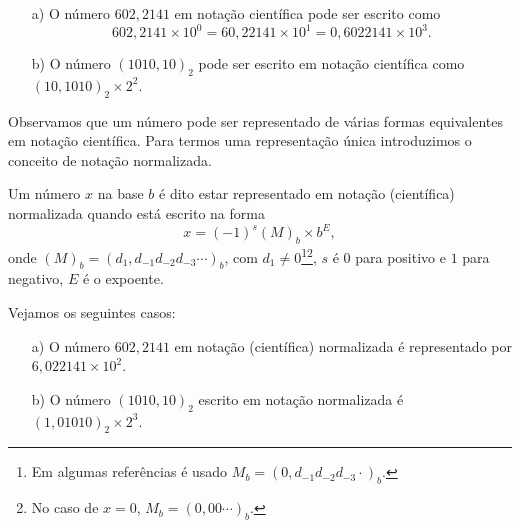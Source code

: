\begin{ex}
  \begin{itemize}
  \item[a)] O número $602,2141$ em notação científica pode ser escrito como
    \begin{equation}
      602,2141\times 10^0 = 60,22141\times 10^{1} = 0,6022141\times 10^{3}.
    \end{equation}
  \item[b)] O número $(1010,10)_2$ pode ser escrito em notação científica como $(10,1010)_2\times 2^2$.
  \end{itemize}
\end{ex}

Observamos que um número pode ser representado de várias formas equivalentes em notação científica. Para termos uma representação única introduzimos o conceito de notação normalizada.

\begin{defn}
  Um número $x$ na base $b$ é dito estar representado em notação (científica) normalizada quando está escrito na forma
  \begin{equation}
    x=(-1)^{s}(M)_b \times b^{E},
  \end{equation}
onde $(M)_b = (d_1,d_{-1}d_{-2}d_{-3}\cdots)_b$, com $d_{1}\neq 0$\footnote{Em algumas referências é usado $M_b = (0,d_{-1}d_{-2}d_{-3}\cdot)_b$.}\footnote{No caso de $x=0$, $M_b = (0,00\cdots)_b$.}, $s$ é $0$ para positivo e $1$ para negativo, $E$ é o expoente.
 \end{defn}

\begin{ex} Vejamos os seguintes casos:
  \begin{itemize}
  \item[a)] O número $602,2141$ em notação (científica) normalizada é representado por $6,022141\times 10^{2}$.
  \item[b)] O número $(1010,10)_2$ escrito em notação normalizada é $(1,01010)_2\times 2^3$.
  \end{itemize}
\end{ex}

